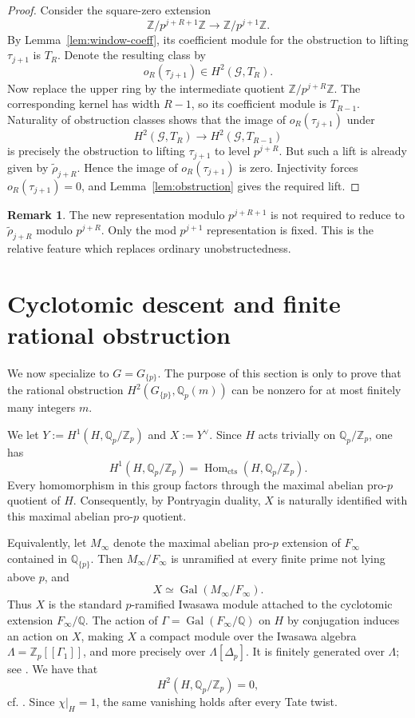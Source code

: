 \documentclass[11pt]{amsart}
\numberwithin{equation}{section}
\newcommand{\Q}{\mathbb Q}
\newcommand{\Z}{\mathbb Z}
\newcommand{\Qp}{\mathbb Q_p}
\newcommand{\Zp}{\mathbb Z_p}
\newcommand{\Gal}{\operatorname{Gal}}
\newcommand{\Hom}{\operatorname{Hom}}
\theoremstyle{definition}
\newtheorem{remark}[theorem]{Remark}
\begin{document}
\begin{proof}
Consider the square-zero extension
\[
 \Z/p^{j+R+1}\Z\longrightarrow\Z/p^{j+1}\Z.
\]
By Lemma~\ref{lem:window-coeff}, its coefficient module for the
obstruction to lifting $\tau_{j+1}$ is $T_R$.  Denote the resulting
class by
\[
        o_R(\tau_{j+1})\in H^2(\mathcal G,T_R).
\]
Now replace the upper ring by the intermediate quotient
$\Z/p^{j+R}\Z$.  The corresponding kernel has width $R-1$, so its
coefficient module is $T_{R-1}$.  Naturality of obstruction classes
shows that the image of $o_R(\tau_{j+1})$ under
\[
 H^2(\mathcal G,T_R)\longrightarrow H^2(\mathcal G,T_{R-1})
\]
is precisely the obstruction to lifting $\tau_{j+1}$ to level
$p^{j+R}$.  But such a lift is already given by
$\widetilde\rho_{j+R}$.  Hence the image of $o_R(\tau_{j+1})$ is zero.
Injectivity forces $o_R(\tau_{j+1})=0$, and
Lemma~\ref{lem:obstruction} gives the required lift.
\end{proof}

\begin{remark}\label{rem:relative-not-compatible}
The new representation modulo $p^{j+R+1}$ is not required to reduce to
$\widetilde\rho_{j+R}$ modulo $p^{j+R}$. Only the mod $p^{j+1}$ representation is fixed. This is the relative feature which replaces ordinary
unobstructedness.
\end{remark}
\section{Cyclotomic descent and finite rational obstruction}\label{sec:cyclotomic}

We now specialize to $G=G_{\{p\}}$.
The purpose of this section is only to prove that the rational obstruction $H^2(G_{\{p\}},\Qp(m))$ can be nonzero for at most finitely many integers $m$.
\par We let $Y:=H^1(H,\Qp/\Zp)$ and $X:=Y^\vee$. Since $H$ acts trivially on
$\Qp/\Zp$, one has
\[
        H^1(H,\Qp/\Zp)
        =
        \Hom_{\mathrm{cts}}(H,\Qp/\Zp).
\]
Every homomorphism in this group factors through the maximal abelian pro-$p$ quotient
of $H$. Consequently, by Pontryagin duality, $X$ is naturally identified with
this maximal abelian pro-$p$ quotient.

\par
Equivalently, let $M_\infty$ denote the maximal abelian pro-$p$ extension of
$F_\infty$ contained in $\Q_{\{p\}}$. Then $M_\infty/F_\infty$ is unramified
at every finite prime not lying above $p$, and
\[
        X\simeq\Gal(M_\infty/F_\infty).
\]
Thus $X$ is the standard $p$-ramified Iwasawa module attached to the
cyclotomic extension $F_\infty/\Q$. The action of
$\Gamma=\Gal(F_\infty/\Q)$ on $H$ by conjugation induces an action on $X$,
making $X$ a compact module over the Iwasawa algebra
$\Lambda=\Zp[[\Gamma_1]]$, and more precisely over $\Lambda[\Delta_p]$. It is finitely generated over $\Lambda$; see \cite[Proposition~11.3.1]{NSW}. We have that
\begin{equation}\label{eq:weak-leopoldt-H}
 H^2(H,\Qp/\Zp)=0,
\end{equation}
cf. \cite[Theorem~10.3.25]{NSW}. Since $\chi|_H=1$, the same vanishing holds after every Tate twist.
\end{document}
